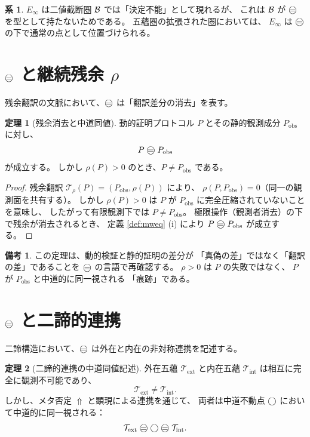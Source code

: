 \documentclass[11pt,a4paper]{article}
\theoremstyle{definition}
\newtheorem{theorem}{定理}[section]
\newtheorem{corollary}{系}[section]
\newtheorem{remark}{備考}[section]
\newcommand{\T}{\mathcal{T}}
\newcommand{\TExt}{\T_{\mathrm{ext}}}
\newcommand{\TInt}{\T_{\mathrm{int}}}
\newcommand{\Einfty}{E_{\infty}}
\begin{document}
\begin{corollary}
$\Einfty$ は二値截断圏 $\mathcal{B}$ では「決定不能」として現れるが、
これは $\mathcal{B}$ が $\mweq$ を型として持たないためである。
五蘊圏の拡張された圏においては、
$\Einfty$ は $\mweq$ の下で通常の点として位置づけられる。
\end{corollary}

\section{\texorpdfstring{$\mweq$}{mw-equivalence} と継続残余 \texorpdfstring{$\rho$}{rho}}

残余翻訳の文脈において、$\mweq$ は「翻訳差分の消去」を表す。

\begin{theorem}[残余消去と中道同値]\label{thm:rho-mweq}
動的証明プロトコル $P$ とその静的観測成分 $P_{\mathrm{obs}}$ に対し、
\[
P \mweq P_{\mathrm{obs}}
\]
が成立する。
しかし $\rho(P)>0$ のとき、$P\neq P_{\mathrm{obs}}$ である。
\end{theorem}

\begin{proof}
残余翻訳 $\mathcal{T}_\rho(P)=(P_{\mathrm{obs}},\rho(P))$ により、
$\rho(P,P_{\mathrm{obs}})=0$（同一の観測面を共有する）。
しかし $\rho(P)>0$ は $P$ が $P_{\mathrm{obs}}$ に完全圧縮されていないことを意味し、
したがって有限観測下では $P\neq P_{\mathrm{obs}}$。
極限操作（観測者消去）の下で残余が消去されるとき、
定義 \ref{def:mweq} (i) により $P\mweq P_{\mathrm{obs}}$ が成立する。
\end{proof}

\begin{remark}
この定理は、動的検証と静的証明の差分が
「真偽の差」ではなく「翻訳の差」であることを
$\mweq$ の言語で再確認する。
$\rho>0$ は $P$ の失敗ではなく、
$P$ が $P_{\mathrm{obs}}$ と中道的に同一視される
「痕跡」である。
\end{remark}

\section{\texorpdfstring{$\mweq$}{mw-equivalence} と二諦的連携}

二諦構造において、$\mweq$ は外在と内在の非対称連携を記述する。

\begin{theorem}[二諦的連携の中道同値記述]\label{thm:twotruths-mweq}
外在五蘊 $\TExt$ と内在五蘊 $\TInt$ は相互に完全に観測不可能であり、
\[
\TExt \neq \TInt.
\]
しかし、メタ否定 $\Uparrow$ と顕現による連携を通じて、
両者は中道不動点 $\bigcirc$ において中道的に同一視される：
\[
\TExt \mweq \dfix \mweq \TInt.
\]
\end{theorem}
\end{document}
